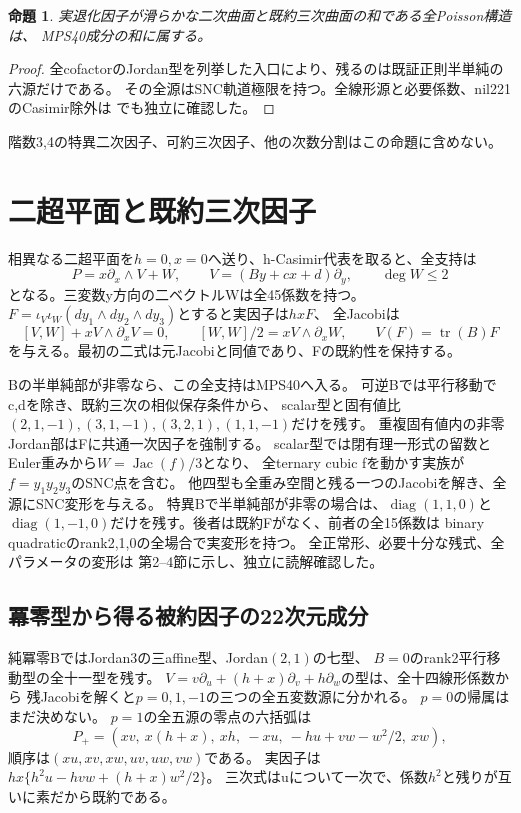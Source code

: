 \documentclass[a4paper,11pt]{ltjsarticle}
\newtheorem{proposition}{命題}[section]
\theoremstyle{definition}
\begin{document}
\begin{proposition}\label{prop:smooth-quadric-cubic}
実退化因子が滑らかな二次曲面と既約三次曲面の和である全Poisson構造は、
MPS40成分の和に属する。
\end{proposition}
\begin{proof}
全cofactorのJordan型を列挙した入口により、残るのは既証正則半単純の六源だけである。
その全源はSNC軌道極限を持つ。全線形源と必要係数、nil221のCasimir除外は
でも独立に確認した。
\end{proof}
階数3,4の特異二次因子、可約三次因子、他の次数分割はこの命題に含めない。



\section{二超平面と既約三次因子}
相異なる二超平面を$h=0,x=0$へ送り、h-Casimir代表を取ると、全支持は
\[
 P=x\partial_x\wedge V+W,\qquad
 V=(By+cx+d)\partial_y,\qquad \deg W\le2
\]
となる。三変数y方向の二ベクトルWは全45係数を持つ。
$F=\iota_V\iota_W(dy_1\wedge dy_2\wedge dy_3)$とすると実因子は$hxF$、
全Jacobiは
\[
 [V,W]+xV\wedge\partial_xV=0,\qquad
 [W,W]/2=xV\wedge\partial_xW,
 \qquad V(F)=\operatorname{tr}(B)F
\]
を与える。最初の二式は元Jacobiと同値であり、Fの既約性を保持する。

Bの半単純部が非零なら、この全支持はMPS40へ入る。
可逆Bでは平行移動でc,dを除き、既約三次の相似保存条件から、
scalar型と固有値比$(2,1,-1),(3,1,-1),(3,2,1),(1,1,-1)$だけを残す。
重複固有値内の非零Jordan部はFに共通一次因子を強制する。
scalar型では閉有理一形式の留数とEuler重みから$W=\operatorname{Jac}(f)/3$となり、
全ternary cubic fを動かす実族が$f=y_1y_2y_3$のSNC点を含む。
他四型も全重み空間と残る一つのJacobiを解き、全源にSNC変形を与える。
特異Bで半単純部が非零の場合は、$\operatorname{diag}(1,1,0)$と
$\operatorname{diag}(1,-1,0)$だけを残す。後者は既約Fがなく、前者の全15係数は
binary quadraticのrank2,1,0の全場合で実変形を持つ。
全正常形、必要十分な残式、全パラメータの変形は
第2--4節に示し、独立に読解確認した。

\subsection{冪零型から得る被約因子の22次元成分}
純冪零BではJordan3の三affine型、Jordan$(2,1)$の七型、
$B=0$のrank2平行移動型の全十一型を残す。
$V=v\partial_u+(h+x)\partial_v+h\partial_w$の型は、全十四線形係数から
残Jacobiを解くと$p=0,1,-1$の三つの全五変数源に分かれる。
$p=0$の帰属はまだ決めない。
$p=1$の全五源の零点の六括弧は
\[
 P_+=(xv,\ x(h+x),\ xh,\ -xu,\ -hu+vw-w^2/2,\ xw),
\]
順序は$(xu,xv,xw,uv,uw,vw)$である。
実因子は$hx\{h^2u-hvw+(h+x)w^2/2\}$。
三次式はuについて一次で、係数$h^2$と残りが互いに素だから既約である。
\end{document}
